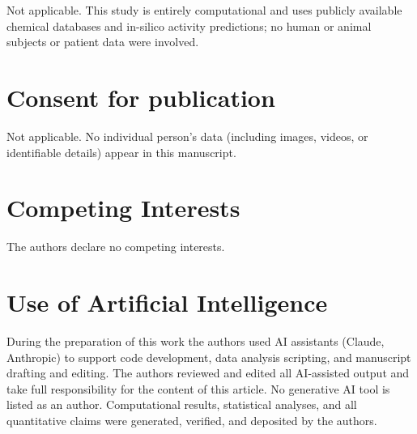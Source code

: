 \documentclass[11pt,a4paper]{article}
\begin{document}
Not applicable. This study is entirely computational and uses publicly available chemical databases and in-silico activity predictions; no human or animal subjects or patient data were involved.

\section*{Consent for publication}

Not applicable. No individual person's data (including images, videos, or identifiable details) appear in this manuscript.

\section*{Competing Interests}

The authors declare no competing interests.

\section*{Use of Artificial Intelligence}

During the preparation of this work the authors used AI assistants (Claude, Anthropic) to support code development, data analysis scripting, and manuscript drafting and editing. The authors reviewed and edited all AI-assisted output and take full responsibility for the content of this article. No generative AI tool is listed as an author. Computational results, statistical analyses, and all quantitative claims were generated, verified, and deposited by the authors.




\end{document}
